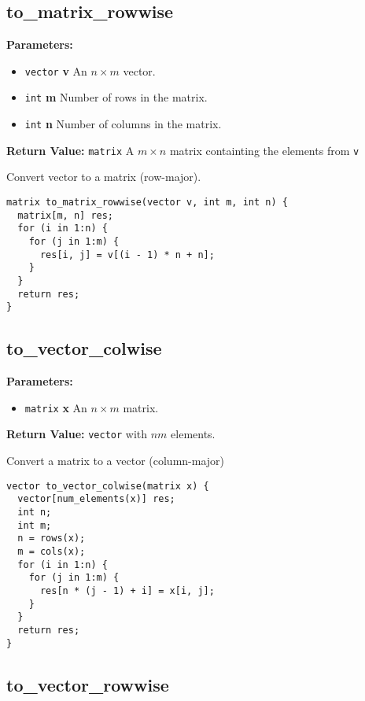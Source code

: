 \documentclass[]{book}
\providecommand{\tightlist}{%
  \setlength{\itemsep}{0pt}\setlength{\parskip}{0pt}}
\begin{document}
\subsection{to\_matrix\_rowwise}\label{toux5fmatrixux5frowwise}

\textbf{Parameters:}

\begin{itemize}
\tightlist
\item
  \texttt{vector} \textbf{v} An \(n \times m\) vector.
\item
  \texttt{int} \textbf{m} Number of rows in the matrix.
\item
  \texttt{int} \textbf{n} Number of columns in the matrix.
\end{itemize}

\textbf{Return Value:} \texttt{matrix} A \(m \times n\) matrix
containting the elements from \texttt{v}

Convert vector to a matrix (row-major).

\begin{verbatim}
matrix to_matrix_rowwise(vector v, int m, int n) {
  matrix[m, n] res;
  for (i in 1:n) {
    for (j in 1:m) {
      res[i, j] = v[(i - 1) * n + n];
    }
  }
  return res;
}
\end{verbatim}

\subsection{to\_vector\_colwise}\label{toux5fvectorux5fcolwise}

\textbf{Parameters:}

\begin{itemize}
\tightlist
\item
  \texttt{matrix} \textbf{x} An \(n \times m\) matrix.
\end{itemize}

\textbf{Return Value:} \texttt{vector} with \(n m\) elements.

Convert a matrix to a vector (column-major)

\begin{verbatim}
vector to_vector_colwise(matrix x) {
  vector[num_elements(x)] res;
  int n;
  int m;
  n = rows(x);
  m = cols(x);
  for (i in 1:n) {
    for (j in 1:m) {
      res[n * (j - 1) + i] = x[i, j];
    }
  }
  return res;
}
\end{verbatim}

\subsection{to\_vector\_rowwise}\label{toux5fvectorux5frowwise}
\end{document}
